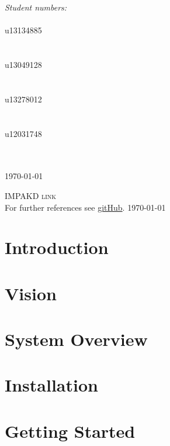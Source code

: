 \documentclass[a4paper,12pt]{article}
\begin{document}
\begin{titlepage}
\begin{center}
\begin{minipage}{0.4\textwidth}
\begin{flushright}
\emph{ \Large Student numbers:} \\[0.4cm]  
\emph{}\\
{\Large u13134885}\\
\emph{}\\
\emph{}\\
{\Large u13049128}\\
\emph{}\\
\emph{}\\
{\Large u13278012}\\
\emph{}\\
\emph{}\\
{\Large u12031748}\\
\emph{}\\
\emph{}\\

\end{flushright}
\end{minipage}


{\large \today}
\end{center}
\end{titlepage}
\renewcommand{\thesection}{\arabic{section}}

\newpage
\begin{center}
\textsc{\Large IMPAKD link}\\[0.5cm]
For further references see \href{https://github.com/u13278012/IMPAKD/}{gitHub}.
\today
\end{center}
\cleardoublepage
\thispagestyle{empty}
\tableofcontents

\newpage
\setcounter{page}{3} 
\section{Introduction}


\section{Vision}


\section{System Overview}


\section{Installation}


\section{Getting Started}
\end{document}
